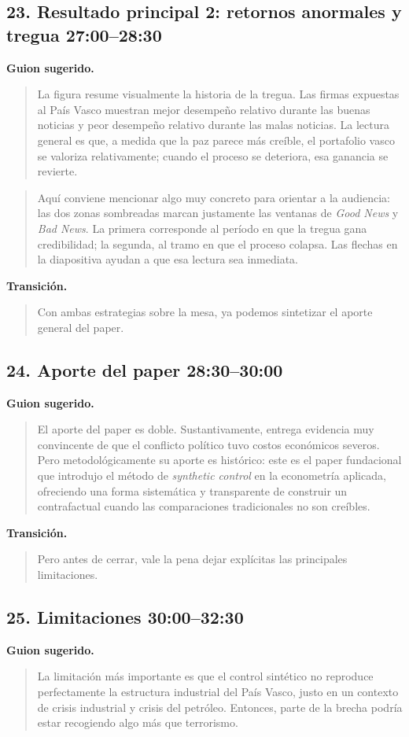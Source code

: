 \documentclass[11pt]{article}
\newcommand{\slideentry}[2]{\subsection*{#1 \hfill #2}}
\begin{document}
\slideentry{23. Resultado principal 2: retornos anormales y tregua}{27:00--28:30}

\textbf{Guion sugerido.}
\begin{quote}
La figura resume visualmente la historia de la tregua. Las firmas expuestas al País Vasco muestran mejor desempeño relativo durante las buenas noticias y peor desempeño relativo durante las malas noticias. La lectura general es que, a medida que la paz parece más creíble, el portafolio vasco se valoriza relativamente; cuando el proceso se deteriora, esa ganancia se revierte.
\end{quote}

\begin{quote}
Aquí conviene mencionar algo muy concreto para orientar a la audiencia: las dos zonas sombreadas marcan justamente las ventanas de \emph{Good News} y \emph{Bad News}. La primera corresponde al período en que la tregua gana credibilidad; la segunda, al tramo en que el proceso colapsa. Las flechas en la diapositiva ayudan a que esa lectura sea inmediata.
\end{quote}

\textbf{Transición.}
\begin{quote}
Con ambas estrategias sobre la mesa, ya podemos sintetizar el aporte general del paper.
\end{quote}

\slideentry{24. Aporte del paper}{28:30--30:00}

\textbf{Guion sugerido.}
\begin{quote}
El aporte del paper es doble. Sustantivamente, entrega evidencia muy convincente de que el conflicto político tuvo costos económicos severos. Pero metodológicamente su aporte es histórico: este es el paper fundacional que introdujo el método de \emph{synthetic control} en la econometría aplicada, ofreciendo una forma sistemática y transparente de construir un contrafactual cuando las comparaciones tradicionales no son creíbles.
\end{quote}

\textbf{Transición.}
\begin{quote}
Pero antes de cerrar, vale la pena dejar explícitas las principales limitaciones.
\end{quote}

\slideentry{25. Limitaciones}{30:00--32:30}

\textbf{Guion sugerido.}
\begin{quote}
La limitación más importante es que el control sintético no reproduce perfectamente la estructura industrial del País Vasco, justo en un contexto de crisis industrial y crisis del petróleo. Entonces, parte de la brecha podría estar recogiendo algo más que terrorismo.
\end{quote}
\end{document}

